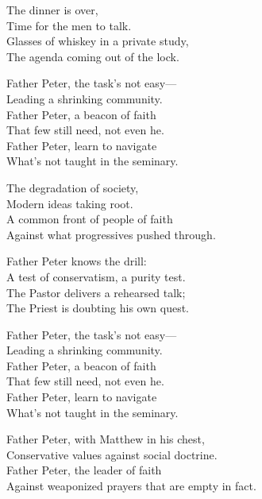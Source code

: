\begin{lyrics}
The dinner is over,\\
Time for the men to talk.\\
Glasses of whiskey in a private study,\\
The agenda coming out of the lock.

Father Peter, the task’s not easy—\\
Leading a shrinking community.\\
Father Peter, a beacon of faith\\
That few still need, not even he.\\
Father Peter, learn to navigate\\
What’s not taught in the seminary.

The degradation of society,\\
Modern ideas taking root.\\
A common front of people of faith\\
Against what progressives pushed through.

Father Peter knows the drill:\\
A test of conservatism, a purity test.\\
The Pastor delivers a rehearsed talk;\\
The Priest is doubting his own quest.

Father Peter, the task’s not easy—\\
Leading a shrinking community.\\
Father Peter, a beacon of faith\\
That few still need, not even he.\\
Father Peter, learn to navigate\\
What’s not taught in the seminary.

Father Peter, with Matthew in his chest,\\
Conservative values against social doctrine.\\
Father Peter, the leader of faith\\
Against weaponized prayers that are empty in fact.
\end{lyrics}

